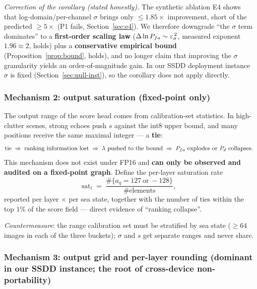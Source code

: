 \emph{Correction of the corollary (stated honestly).} The synthetic ablation E4 shows that log-domain/per-channel $\sigma$ brings only $\le1.85\times$ improvement, short of the predicted $\ge5\times$ (P1 fails, Section~\ref{sec:e4}).
We therefore downgrade ``the $\sigma$ term dominates'' to a \textbf{first-order scaling law} ($\Delta\ln P_{fa}\sim\varepsilon_\sigma^{\,2}$, measured exponent $1.96\approx2$, holds) plus a \textbf{conservative empirical bound} (Proposition~\ref{prop:bound}, holds), and no longer claim that improving the $\sigma$ granularity yields an order-of-magnitude gain.
In our SSDD deployment instance $\sigma$ is fixed (Section~\ref{sec:null-inst}), so the corollary does not apply directly.

\subsubsection{Mechanism 2: output saturation (fixed-point only)}
\label{sec:mech-sat}

The output range of the score head comes from calibration-set statistics.
In high-clutter scenes, strong echoes push $s$ against the int8 upper bound, and many positions receive the same maximal integer --- a \textbf{tie}:
\begin{equation}
\text{tie}\;\Rightarrow\;\text{ranking information lost}\;\Rightarrow\;\lambda\ \text{pushed to the bound}\;\Rightarrow\; P_{fa}\ \text{explodes or}\ P_d\ \text{collapses}.
\label{eq:tie}
\end{equation}
This mechanism does not exist under FP16 and \textbf{can only be observed and audited on a fixed-point graph}.
Define the per-layer saturation rate
\begin{equation}
\mathrm{sat}_l \;=\; \frac{\#\{a_q=127\ \text{or}\ -128\}}{\#\text{elements}},
\label{eq:sat}
\end{equation}
reported per layer $\times$ per sea state, together with the number of ties within the top $1\%$ of the score field --- direct evidence of ``ranking collapse''.

\emph{Countermeasure}: the range calibration set must be stratified by sea state ($\ge64$ images in each of the three buckets); $\sigma$ and $s$ get separate ranges and never share.

\subsubsection{Mechanism 3: output grid and per-layer rounding (dominant in our SSDD instance; the root of cross-device non-portability)}
\label{sec:mech-grid}

